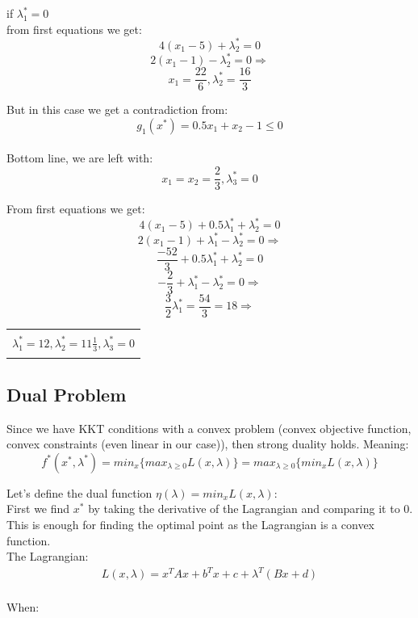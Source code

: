 \documentclass[12pt]{article}
\newcommand{\rectres}[1]{
\begin{center}
\begin{tabular}{ |c| }
\hline
\\
 #1\\
 \\
\hline
\end{tabular}
\end{center}
}
\begin{document}
if $\lambda^*_1=0$\\
from first equations we get:\\
$$4(x_1-5) +\lambda^*_2 = 0$$
$$2(x_1-1) -\lambda^*_2 = 0 \Rightarrow$$
$$x_1=\frac{22}{6}, \lambda^*_2 = \frac{16}{3}$$

But in this case we get a contradiction from:
$$ g_1(x^*) = 0.5x_1 +x_2 -1 \leq 0$$\\

Bottom line, we are left with:\\
$$x_1=x_2=\frac{2}{3},\lambda^*_3=0$$

From first equations we get:\\
$$4(x_1-5)  + 0.5\lambda^*_1 +\lambda^*_2 = 0$$
$$2(x_1-1)  + \lambda^*_1 -\lambda^*_2 = 0 \Rightarrow$$
$$\frac{-52}{3}  + 0.5\lambda^*_1 +\lambda^*_2 = 0$$
$$-\frac{2}{3}  + \lambda^*_1 -\lambda^*_2 = 0 \Rightarrow$$
$$\frac{3}{2}\lambda^*_1 = \frac{54}{3} = 18 \Rightarrow$$
\rectres{$\lambda^*_1 = 12,\lambda^*_2 = 11\frac{1}{3}, \lambda^*_3=0$}

\subsection{Dual Problem}

Since we have KKT conditions with a convex problem (convex objective function, convex constraints (even linear in our case)), then strong duality holds. Meaning:\\
$$f^*(x^*,\lambda^*) = min_x \{max_{\lambda \geq 0} L(x,\lambda)\} =  max_{\lambda \geq 0}\{min_x L(x,\lambda)\}$$

Let's define the dual function $\eta(\lambda) = min_x L(x,\lambda)$:\\

First we find $x^*$ by taking the derivative of the Lagrangian and comparing it to 0. This is enough for finding the optimal point as the Lagrangian is a convex function.\\

The Lagrangian:
\begin{gather*}
    L(x,\lambda) =  x^TAx + b^Tx + c + \lambda^T (Bx + d)\\
\end{gather*}

When:\\
\end{document}
